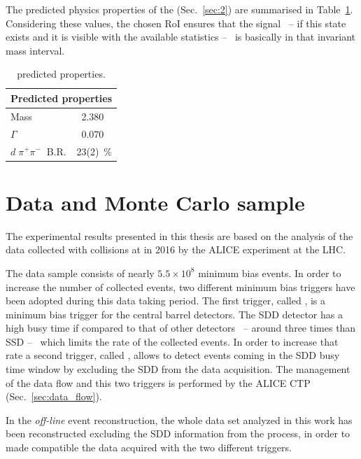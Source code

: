 The predicted physics properties of the \dst (Sec.~\ref{sec:2}) are summarised in Table~\ref{tab:dst_prop}. 
Considering these values, the chosen RoI ensures that the signal \ -- if this state exists and it is visible with the available statistics
-- \ is basically in that invariant mass interval.
\begingroup
\renewcommand{\arraystretch}{1.5} %
\begin{table}
\centering
\captionsetup{justification=centering}
\begin{tabular}{lr}
\multicolumn{2}{c}{\textbf{Predicted properties}}      \\
\toprule
Mass				                   & 2.380 \ \gevcs   \\
$\Gamma$			        	       & 0.070 \ \gevcs   \\
$d\; \pi^{+} \pi^{-}\ $ B.R.	 & 23(2)\ \%		    \\
\midrule
\end{tabular}
\caption{\dst predicted properties.}
\label{tab:dst_prop}
\end{table}
\endgroup

%
%
\section{Data and Monte Carlo sample} \label{sec:4.2}

The experimental results presented in this thesis are based on the analysis of the data collected with \pPb collisions at \sctev in 2016 by the ALICE experiment at the LHC. 

The data sample  consists of nearly $5.5\times10^{8}$ minimum bias events.
In order to increase the number of collected events, two
different minimum bias triggers have been adopted during this data taking period.
The first trigger, called , is a minimum bias trigger for the central barrel
detectors. The SDD detector has a high busy time if compared to that of other detectors \ -- around three times
than SSD -- \ which limits the rate of the collected events. 
In order to increase that rate a second trigger, called , allows
to detect events coming in the SDD busy time window by excluding the SDD from the data acquisition.
The management of the data flow and this two triggers is performed by the ALICE 
CTP (Sec.~\ref{sec:data_flow}).

In the \textit{off-line} event reconstruction, the whole data set analyzed in this work has been
reconstructed excluding the SDD information from the process, in order to made compatible
the data acquired with the two different triggers.

